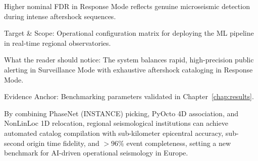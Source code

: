 \begin{table}[htbp]
\begin{threeparttable}
\begin{tablenotes}[flushleft]
      \item[b] Higher nominal FDR in Response Mode reflects genuine microseismic detection during intense aftershock sequences.
      \item Target \& Scope: Operational configuration matrix for deploying the ML pipeline in real-time regional observatories.
      \item What the reader should notice: The system balances rapid, high-precision public alerting in Surveillance Mode with exhaustive aftershock cataloging in Response Mode.
      \item Evidence Anchor: Benchmarking parameters validated in Chapter~\ref{chap:results}.
    \end{tablenotes}
  \end{threeparttable}
\end{table}

By combining PhaseNet (INSTANCE) picking, PyOcto 4D association, and NonLinLoc 1D relocation, regional seismological institutions can achieve automated catalog compilation with sub-kilometer epicentral accuracy, sub-second origin time fidelity, and $>96\%$ event completeness, setting a new benchmark for AI-driven operational seismology in Europe.

